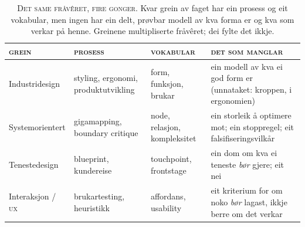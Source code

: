 \begin{table}[t]
\centering
\small
\begin{tabular}{@{}p{24mm}p{30mm}p{28mm}p{34mm}@{}}
\toprule
\textsc{grein} & \textsc{prosess} & \textsc{vokabular} & \textsc{det som manglar} \\
\midrule
Industri\-design & styling, ergonomi, produktutvikling & form, funksjon, brukar & ein modell av kva ei god form er (unnataket: kroppen, i ergonomien) \\[4pt]
System\-orientert & gigamapping, boundary critique & node, relasjon, kompleksitet & ein storleik å optimere mot; ein stoppregel; eit falsifiseringsvilkår \\[4pt]
Teneste\-design & blueprint, kundereise & touchpoint, frontstage & ein dom om kva ei teneste \emph{bør} gjere; eit nei \\[4pt]
Interaksjon / \textsc{ux} & brukartesting, heuristikk & affordans, usability & eit kriterium for om noko \emph{bør} lagast, ikkje berre om det verkar \\
\bottomrule
\end{tabular}
\caption{\textsc{Det same fråvêret, fire gonger.} Kvar grein av faget har ein prosess og eit vokabular, men ingen har ein delt, prøvbar modell av kva forma er og kva som verkar på henne. Greinene multipliserte fråvêret; dei fylte det ikkje.}
\end{table}
